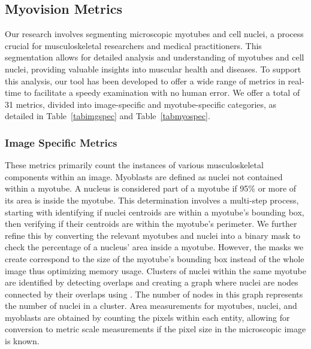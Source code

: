 \subsection{Myovision Metrics}
Our research involves segmenting microscopic myotubes and cell nuclei, a process crucial for musculoskeletal researchers and medical practitioners. This segmentation allows for detailed analysis and understanding of myotubes and cell nuclei, providing valuable insights into muscular health and diseases. To support this analysis, our tool has been developed to offer a wide range of metrics in real-time to facilitate a speedy examination with no human error. We offer a total of 31 metrics, divided into image-specific and myotube-specific categories, as detailed in Table~\ref{tabimgspec} and Table~\ref{tabmyospec}.
\subsubsection{Image Specific Metrics}
These metrics primarily count the instances of various musculoskeletal components within an image. Myoblasts are defined as nuclei not contained within a myotube. A nucleus is considered part of a myotube if 95\% or more of its area is inside the myotube. This determination involves a multi-step process, starting with identifying if nuclei centroids are within a myotube's bounding box, then verifying if their centroids are within the myotube's perimeter. We further refine this by converting the relevant myotubes and nuclei into a binary mask to check the percentage of a nucleus' area inside a myotube. However, the masks we create correspond to the size of the myotube’s bounding box instead of the whole image thus optimizing memory usage. Clusters of nuclei within the same myotube are identified by detecting overlaps and creating a graph where nuclei are nodes connected by their overlaps using \cite{hagberg2008exploring, hagberg2020networkx}. The number of nodes in this graph represents the number of nuclei in a cluster. Area measurements for myotubes, nuclei, and myoblasts are obtained by counting the pixels within each entity, allowing for conversion to metric scale measurements if the pixel size in the microscopic image is known.
